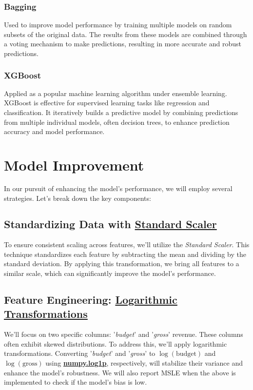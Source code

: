 \documentclass[conference]{IEEEtran}
\begin{document}
    \subsubsection{Bagging}
        Used to improve model performance by training multiple models on random subsets of the original data. The results from these models are combined through a voting mechanism to make predictions, resulting in more accurate and robust predictions.
    
    \subsubsection{XGBoost}
        Applied as a popular machine learning algorithm under ensemble learning. XGBoost is effective for supervised learning tasks like regression and classification. It iteratively builds a predictive model by combining predictions from multiple individual models, often decision trees, to enhance prediction accuracy and model performance.

\section{Model Improvement}
    In our pursuit of enhancing the model's performance, we will employ several strategies. Let's break down the key components:
    
    \subsection{Standardizing Data with \href{https://scikit-learn.org/stable/modules/generated/sklearn.preprocessing.StandardScaler.html}{Standard Scaler}}
    
        To ensure consistent scaling across features, we'll utilize the \textit{Standard Scaler}. This technique standardizes each feature by subtracting the mean and dividing by the standard deviation. By applying this transformation, we bring all features to a similar scale, which can significantly improve the model's performance.
    
    \subsection{Feature Engineering: \href{https://numpy.org/doc/stable/reference/generated/numpy.log1p.html}{Logarithmic Transformations}}
    
        We'll focus on two specific columns: '\textit{budget}' and '\textit{gross}' revenue. These columns often exhibit skewed distributions. To address this, we'll apply logarithmic transformations. Converting '\textit{budget}' and '\textit{gross}' to \textit{\(\log(\text{budget})\)} and \textit{\(\log(\text{gross})\)} using \href{https://numpy.org/doc/stable/reference/generated/numpy.log1p.html}{\textbf{numpy.log1p}}, respectively, will stabilize their variance and enhance the model's robustness. We will also report MSLE when the above is implemented to check if the model's bias is low.
    
\end{document}
